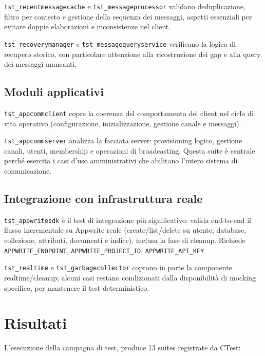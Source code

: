 \documentclass[a4paper, 11pt, twoside]{report}
\begin{document}
\texttt{tst\_recentmessagecache} e \texttt{tst\_messageprocessor} validano deduplicazione, filtro per contesto e gestione della
sequenza dei messaggi, aspetti essenziali per evitare doppie elaborazioni e inconsistenze nel client.

\texttt{tst\_recoverymanager} e \texttt{tst\_messagequeryservice} verificano la logica di recupero storico, con particolare attenzione
alla ricostruzione dei gap e alla query dei messaggi mancanti.

\subsection{Moduli applicativi}

\texttt{tst\_appcommclient} copre la coerenza del comportamento del client nel ciclo di vita operativo (configurazione, inizializzazione,
gestione canale e messaggi).

\texttt{tst\_appcommserver} analizza la facciata server: provisioning logico, gestione canali, utenti, membership e operazioni di 
broadcasting. Questa suite è centrale perché esercita i casi d'uso amministrativi che abilitano l'intero sistema di comunicazione.  

\subsection{Integrazione con infrastruttura reale}

\texttt{tst\_appwritesdk} è il test di integrazione più significativo: valida end-to-end il flusso incrementale su Appwrite reale
(create/list/delete su utente, database, collezione, attributi, documenti e indice), inclusa la fase di cleanup. Richiede 
\texttt{APPWRITE\_ENDPOINT}, \texttt{APPWRITE\_PROJECT\_ID}, \texttt{APPWRITE\_API\_KEY}.

\texttt{tst\_realtime} e \texttt{tst\_garbagecollector} coprono in parte la componente realtime/cleanup; alcuni casi restano condizionati
dalla disponibilità di mocking specifico, per mantenere il test deterministico.

\section{Risultati}

L'esecuzione della campagna di test, produce 13 suites registrate da CTest:
\end{document}
